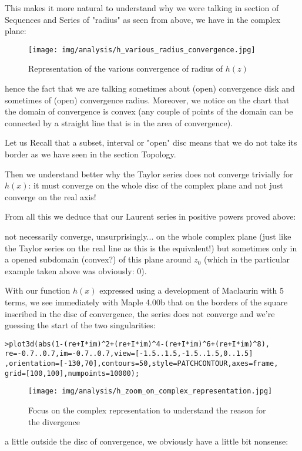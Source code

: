 	This makes it more natural to understand why we were talking in section of Sequences and Series of "radius" as seen from above, we have in the complex plane:
	\begin{figure}[H]
		\begin{center}
			\texttt{[image: img/analysis/h\_various\_radius\_convergence.jpg]}
		\end{center}	
		\caption{Representation of the various convergence of radius of $h(z)$}
	\end{figure}
	hence the fact that we are talking sometimes about (open) convergence disk and sometimes of (open) convergence radius. Moreover, we notice on the chart that the domain of convergence is convex (any couple of points of the domain can be connected by a straight line that is in the area of convergence).
	\begin{tcolorbox}[title=Remark,colframe=black,arc=10pt]
	Let us Recall that a subset, interval or "open" disc means that we do not take its border as we have seen in the section Topology.
	\end{tcolorbox}
	Then we understand better why the Taylor series does not converge trivially for $h(x)$: it must converge on the whole disc of the complex plane and not just converge on the real axis!
	
	From all this we deduce that our Laurent series in positive powers proved above:
	
	not necessarily converge, unsurprisingly... on the whole complex plane (just like the Taylor series on the real line as this is the equivalent!) but sometimes only in a opened subdomain (convex?) of this plane around $z_0$ (which in the particular example taken above was obviously: $0$).
	
	With our function $h(x)$ expressed using a development of Maclaurin with 5 terms, we see immediately with Maple 4.00b that on the borders of the square inscribed in the disc of convergence, the series does not converge and we're guessing the start of the two singularities:
	
	\texttt{>plot3d(abs(1-(re+I*im)\string^2+(re+I*im)\string^4-(re+I*im)\string^6+(re+I*im)\string^8),\\
	re=-0.7..0.7,im=-0.7..0.7,view=[-1.5..1.5,-1.5..1.5,0..1.5]\\
	,orientation=[-130,70],contours=50,style=PATCHCONTOUR,axes=frame,\\
	grid=[100,100],numpoints=10000);}
	
	\begin{figure}[H]
		\begin{center}
			\texttt{[image: img/analysis/h\_zoom\_on\_complex\_representation.jpg]}
		\end{center}	
		\caption{Focus on the complex representation to understand the reason for the divergence}
	\end{figure}
	a little outside the disc of convergence, we obviously have a little bit nonsense:
	
